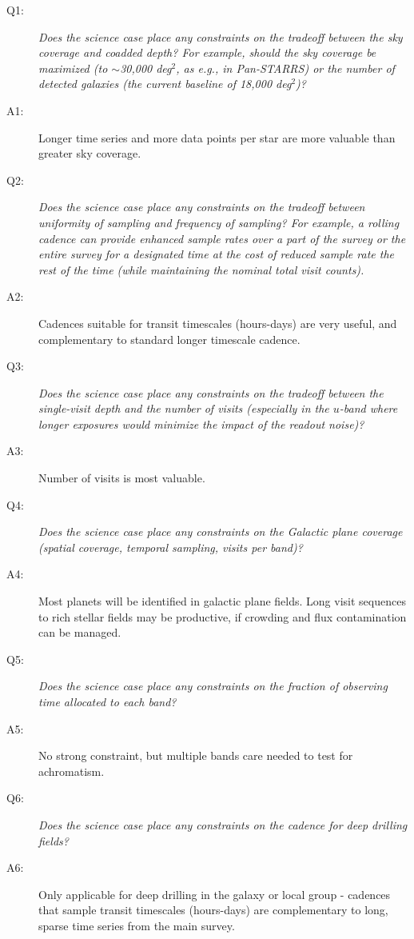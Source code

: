  \begin{description}
%
 \item[Q1:] {\it Does the science case place any constraints on the
 tradeoff between the sky coverage and coadded depth? For example, should
the sky coverage be maximized (to $\sim$30,000 deg$^2$, as e.g., in
 Pan-STARRS) or the number of detected galaxies (the current baseline 
of 18,000 deg$^2$)?}
%
\item[A1:] Longer time series and more data points per star are more valuable than greater sky coverage.
%
\item[Q2:] {\it Does the science case place any constraints on the
 tradeoff between uniformity of sampling and frequency of  sampling? For
 example, a rolling cadence can provide enhanced sample rates over a part
 of the survey or the entire survey for a designated time at the cost of
 reduced sample rate the rest of the time (while maintaining the nominal
 total visit counts).}
%
\item[A2:] Cadences suitable for transit timescales (hours-days) are very useful, and complementary to 
standard longer timescale cadence.
%
 \item[Q3:] {\it Does the science case place any constraints on the
 tradeoff between the single-visit depth and the number of visits
 (especially in the $u$-band where longer exposures would minimize the
 impact of the readout noise)?}
%
 \item[A3:] Number of visits is most valuable.
%
 \item[Q4:] {\it Does the science case place any constraints on the
 Galactic plane coverage (spatial coverage, temporal sampling, visits per
 band)?}
%
 \item[A4:] Most planets will be identified in galactic plane fields. Long visit sequences to
rich stellar fields may be productive, if crowding and flux contamination can be managed.
%
 \item[Q5:] {\it Does the science case place any constraints on the
 fraction of observing time allocated to each band?}
%
 \item[A5:] No strong constraint, but multiple bands care needed to test for achromatism.
%
 \item[Q6:] {\it Does the science case place any constraints on the
 cadence for deep drilling fields?}
%
 \item[A6:] Only applicable for deep drilling in the galaxy or local group - cadences that sample transit timescales (hours-days)
are complementary to long, sparse time series from the main survey.

\end{description}
